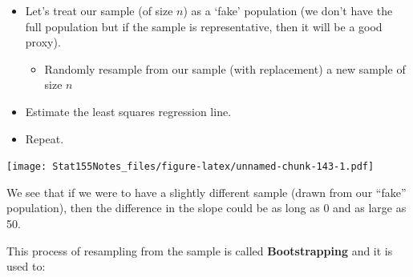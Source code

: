 \documentclass[]{book}
\newenvironment{Shaded}{\begin{snugshade}}{\end{snugshade}}
\newcommand{\CommentTok}[1]{\textcolor[rgb]{0.56,0.35,0.01}{\textit{#1}}}
\newcommand{\DataTypeTok}[1]{\textcolor[rgb]{0.13,0.29,0.53}{#1}}
\newcommand{\DecValTok}[1]{\textcolor[rgb]{0.00,0.00,0.81}{#1}}
\newcommand{\KeywordTok}[1]{\textcolor[rgb]{0.13,0.29,0.53}{\textbf{#1}}}
\newcommand{\NormalTok}[1]{#1}
\newcommand{\OperatorTok}[1]{\textcolor[rgb]{0.81,0.36,0.00}{\textbf{#1}}}
\newcommand{\StringTok}[1]{\textcolor[rgb]{0.31,0.60,0.02}{#1}}
\providecommand{\tightlist}{%
  \setlength{\itemsep}{0pt}\setlength{\parskip}{0pt}}
\begin{document}
\begin{itemize}
\tightlist
\item
  Let's treat our sample (of size \(n\)) as a `fake' population (we don't have the full population but if the sample is representative, then it will be a good proxy).

  \begin{itemize}
  \tightlist
  \item
    Randomly resample from our sample (with replacement) a new sample of size \(n\)
  \end{itemize}
\item
  Estimate the least squares regression line.
\item
  Repeat.
\end{itemize}

\begin{Shaded}
\end{Shaded}

\texttt{[image: Stat155Notes\_files/figure-latex/unnamed-chunk-143-1.pdf]}

We see that if we were to have a slightly different sample (drawn from our ``fake'' population), then the difference in the slope could be as long as 0 and as large as 50.

This process of resampling from the sample is called \textbf{Bootstrapping} and it is used to:
\end{document}
